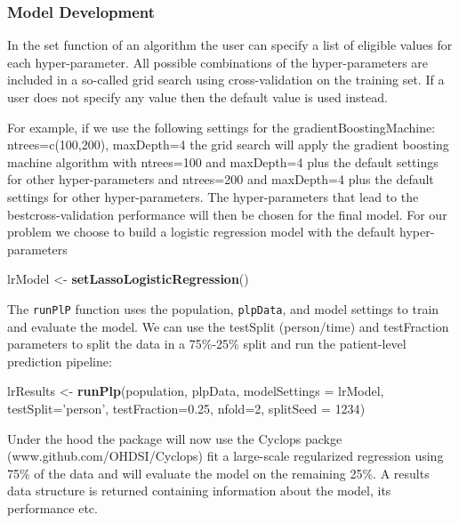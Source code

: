 \documentclass[]{book}
\newenvironment{Shaded}{\begin{snugshade}}{\end{snugshade}}
\newcommand{\KeywordTok}[1]{\textcolor[rgb]{0.13,0.29,0.53}{\textbf{#1}}}
\newcommand{\DataTypeTok}[1]{\textcolor[rgb]{0.13,0.29,0.53}{#1}}
\newcommand{\DecValTok}[1]{\textcolor[rgb]{0.00,0.00,0.81}{#1}}
\newcommand{\FloatTok}[1]{\textcolor[rgb]{0.00,0.00,0.81}{#1}}
\newcommand{\StringTok}[1]{\textcolor[rgb]{0.31,0.60,0.02}{#1}}
\newcommand{\NormalTok}[1]{#1}
\begin{document}
\subsubsection{Model Development}\label{model-development}

In the set function of an algorithm the user can specify a list of
eligible values for each hyper-parameter. All possible combinations of
the hyper-parameters are included in a so-called grid search using
cross-validation on the training set. If a user does not specify any
value then the default value is used instead.

For example, if we use the following settings for the
gradientBoostingMachine: ntrees=c(100,200), maxDepth=4 the grid search
will apply the gradient boosting machine algorithm with ntrees=100 and
maxDepth=4 plus the default settings for other hyper-parameters and
ntrees=200 and maxDepth=4 plus the default settings for other
hyper-parameters. The hyper-parameters that lead to the
bestcross-validation performance will then be chosen for the final
model. For our problem we choose to build a logistic regression model
with the default hyper-parameters

\begin{Shaded}
\begin{Highlighting}[]
\NormalTok{lrModel <-}\StringTok{ }\KeywordTok{setLassoLogisticRegression}\NormalTok{()}
\end{Highlighting}
\end{Shaded}

The \texttt{runPlP} function uses the population, \texttt{plpData}, and
model settings to train and evaluate the model. We can use the testSplit
(person/time) and testFraction parameters to split the data in a
75\%-25\% split and run the patient-level prediction pipeline:

\begin{Shaded}
\begin{Highlighting}[]
\NormalTok{lrResults <-}\StringTok{ }\KeywordTok{runPlp}\NormalTok{(population, plpData, }\DataTypeTok{modelSettings =}\NormalTok{ lrModel, }\DataTypeTok{testSplit=}\StringTok{'person'}\NormalTok{, }
                    \DataTypeTok{testFraction=}\FloatTok{0.25}\NormalTok{, }\DataTypeTok{nfold=}\DecValTok{2}\NormalTok{, }\DataTypeTok{splitSeed =} \DecValTok{1234}\NormalTok{)}
\end{Highlighting}
\end{Shaded}

Under the hood the package will now use the Cyclops packge
(www.github.com/OHDSI/Cyclops) fit a large-scale regularized regression
using 75\% of the data and will evaluate the model on the remaining
25\%. A results data structure is returned containing information about
the model, its performance etc.
\end{document}
